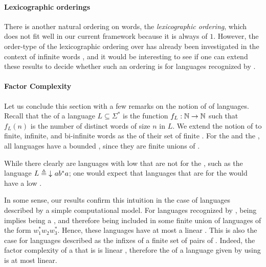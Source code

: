 \paragraph*{Lexicographic orderings} There is another natural ordering on
words, the \emph{lexicographic ordering}, which does not fit well in our
current framework because it is always of  $1$. However, the
order-type of the lexicographic ordering over  has
already been investigated in the context of infinite words \cite{CACOPU18}, and
it would be interesting to see if one can extend these results to decide
whether such an ordering is  for languages recognized by
.

\paragraph*{Factor Complexity} \AP Let us conclude this section with a few
remarks on the notion of  of languages. Recall that the
 of a language $L \subseteq \Sigma^*$ is the function
$f_L: \mathbb{N} \to \mathbb{N}$ such that $f_L(n)$ is the number of distinct words of size
$n$ in $L$. We extend the notion of  to finite, infinite,
and bi-infinite words as the  of their set of finite
. For the  and the , all
 languages have a bounded , since
they are finite unions of .

While there clearly are languages with low  that are not
 for the , such as the language $L
\defined \dwset{ a b^* a }$; one would expect that languages that are
 for the  would have a low .

In some sense, our results confirm this intuition in the case of languages
described by a simple computational model. For languages recognized by
, being  implies being a
, and therefore being  included in some finite union of
languages of the form $w_1^* w_2 w_3^*$. Hence, these languages have at most a
linear . This is also the case for languages described
as the infixes of a finite set of pairs of . Indeed, the
factor complexity of a  that is 
is linear \cite[Theorem 24]{NIPR09}, therefore the  of a
language given by  using  is
at most linear. 

